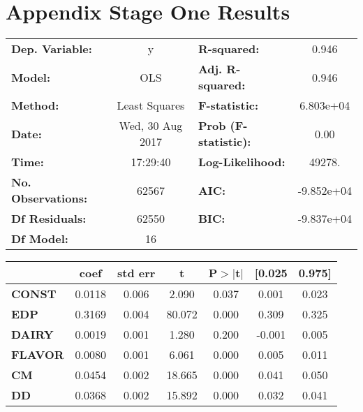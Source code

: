 \documentclass{article}
\begin{document}
\section{Appendix Stage One Results}

\begin{center}
\begin{tabular}{lclc}
\toprule
\textbf{Dep. Variable:}    &        y         & \textbf{  R-squared:         } &     0.946   \\
\textbf{Model:}            &       OLS        & \textbf{  Adj. R-squared:    } &     0.946   \\
\textbf{Method:}           &  Least Squares   & \textbf{  F-statistic:       } & 6.803e+04   \\
\textbf{Date:}             & Wed, 30 Aug 2017 & \textbf{  Prob (F-statistic):} &     0.00    \\
\textbf{Time:}             &     17:29:40     & \textbf{  Log-Likelihood:    } &    49278.   \\
\textbf{No. Observations:} &       62567      & \textbf{  AIC:               } & -9.852e+04  \\
\textbf{Df Residuals:}     &       62550      & \textbf{  BIC:               } & -9.837e+04  \\
\textbf{Df Model:}         &          16      & \textbf{                     } &             \\
\bottomrule
\end{tabular}
\begin{tabular}{lcccccc}
               & \textbf{coef} & \textbf{std err} & \textbf{t} & \textbf{P$>$$|$t$|$} & \textbf{[0.025} & \textbf{0.975]}  \\
\midrule
\textbf{CONST} &       0.0118  &        0.006     &     2.090  &         0.037        &        0.001    &        0.023     \\
\textbf{EDP}    &       0.3169  &        0.004     &    80.072  &         0.000        &        0.309    &        0.325     \\
\textbf{DAIRY}    &       0.0019  &        0.001     &     1.280  &         0.200        &       -0.001    &        0.005     \\
\textbf{FLAVOR}    &       0.0080  &        0.001     &     6.061  &         0.000        &        0.005    &        0.011     \\
\textbf{CM}    &       0.0454  &        0.002     &    18.665  &         0.000        &        0.041    &        0.050     \\
\textbf{DD}    &       0.0368  &        0.002     &    15.892  &         0.000        &        0.032    &        0.041     \\

\end{tabular}
\end{center}
\end{document}
